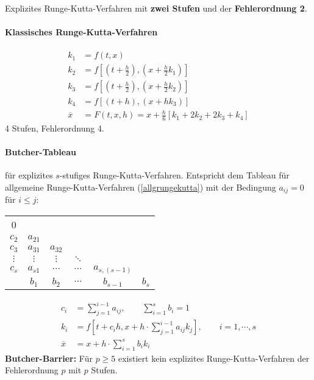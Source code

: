 				Explizites Runge-Kutta-Verfahren mit \textbf{zwei Stufen} und der \textbf{Fehlerordnung 2}.

			\paragraph{Klassisches Runge-Kutta-Verfahren}
				\begin{align*}
					k_1 &= f(t,x) \\
					k_2 &= f\left[ \left( t+\frac{h}{2}\right),\left( x + \frac{h}{2}k_1\right)\right] \\
					k_3 &= f\left[ \left( t+\frac{h}{2}\right),\left( x + \frac{h}{2}k_2\right)\right] \\
					k_4 &= f\left[ \left( t+h\right),\left( x + hk_3\right)\right] \\
					\overline{x} &= F(t,x,h)=x + \frac{h}{6}\left[ k_1 + 2k_2 + 2k_3 + k_4\right]
				\end{align*}
				4 Stufen, Fehlerordnung 4.

			\paragraph{Butcher-Tableau}
				für explizites $s$-stufiges Runge-Kutta-Verfahren. Entspricht dem Tableau für allgemeine Runge-Kutta-Verfahren (\ref{allgrungekutta}) mit der Bedingung $a_{ij}=0$ für $i \leq j$:

				\hspace{5ex}
				\begin{tabular}{c|ccccc}
					0 & & & & & \\
					$c_2$ & $a_{21}$ & & & & \\
					$c_3$ & $a_{31}$ & $a_{32}$ & & & \\
					$\vdots$ & $\vdots$ & $\vdots$ & $\ddots$ & & \\
					$c_s$ & $a_{s1}$ & $\cdots$ & $\cdots$ & $a_{s,(s-1)}$ & \\
					\hline & $b_1$ & $b_2$ & $\cdots$ & $b_{s-1}$ & $b_s$\\
				\end{tabular}
				\begin{align*}
					c_i &= \sum\limits_{j=1}^{i-1}a_{ij}, \qquad \sum\limits_{i=1}^s b_i = 1 \\
					k_i &= f\left[t+c_ih , x+h\cdot \sum_{j=1}^{i-1} a_{ij}k_j\right], \qquad i=1, \cdots , s \\
					\overline{x} &= x + h \cdot \sum\limits_{i=1}^s b_ik_i
				\end{align*}
				\textbf{Butcher-Barrier:} Für $p \geq 5$ existiert kein explizites Runge-Kutta-Verfahren der Fehlerordnung $p$ mit $p$ Stufen.

